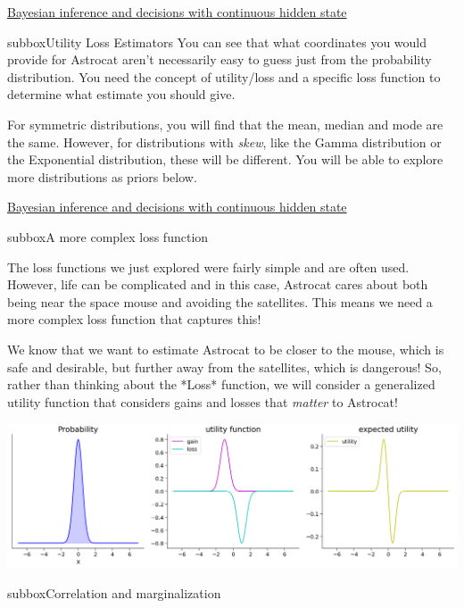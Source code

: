 \begin{textbox}{\href{https://compneuro.neuromatch.io/tutorials/W3D1_BayesianDecisions/student/W3D1_Tutorial2.html}{Bayesian inference and decisions with continuous hidden state } }
\begin{subbox}{subbox}{Utility Loss Estimators}
You can see that what coordinates you would provide for Astrocat aren't necessarily easy to guess just from the probability distribution. You need the concept of utility/loss and a specific loss function to determine what estimate you should give.

For symmetric distributions, you will find that the mean, median and mode are the same. However, for distributions with \textit{skew}, like the Gamma distribution or the Exponential distribution, these will be different. You will be able to explore more distributions as priors below.

\end{subbox}

\end{textbox}
\begin{textbox}{\href{https://compneuro.neuromatch.io/tutorials/W3D1_BayesianDecisions/student/W3D1_Tutorial2.html}{Bayesian inference and decisions with continuous hidden state } }
\begin{subbox}{subbox}{A more complex loss function}
\scriptsize



The loss functions we just explored were fairly simple and are often used. However, life can be complicated and in this case, Astrocat cares about both being near the space mouse and avoiding the satellites. This means we need a more complex loss function that captures this! 

We know that we want to estimate Astrocat to be closer to the mouse, which is safe and desirable, but further away from the satellites, which is dangerous! So, rather than thinking about the *Loss* function, we will consider a generalized utility function that considers gains and losses that \textit{matter} to Astrocat!
\begin{center}
\includegraphics[scale=0.18]{Figures/BD/BD_Figure9.png}
\end{center}


\end{subbox}
\begin{subbox}{subbox}{Correlation and marginalization}
\scriptsize


\end{subbox}
\end{textbox}
